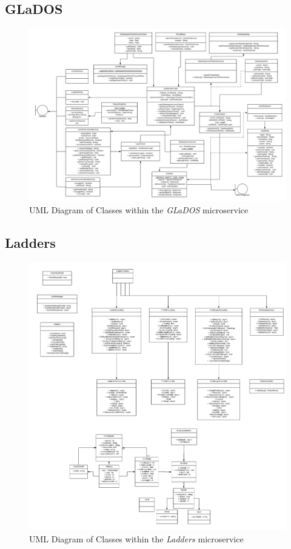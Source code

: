 \begin{landscape}
\subsection{GLaDOS}
\begin{figure}[H]
    \centering
    \includegraphics[width=\textwidth]{Images/class_uml/glados.png}
    \caption{UML Diagram of Classes within the \textit{GLaDOS} microservice}
    \label{fig:class_uml:glados}
\end{figure}

\subsection{Ladders}
\begin{figure}[H]
    \centering
    \includegraphics[width=\textwidth]{Images/class_uml/ladders.png}
    \caption{UML Diagram of Classes within the \textit{Ladders} microservice}
    \label{fig:class_uml:ladders}
\end{figure}


\end{landscape}

\setchapterheaderfooter{} 
\renewcommand{\headrulewidth}{0.4pt}